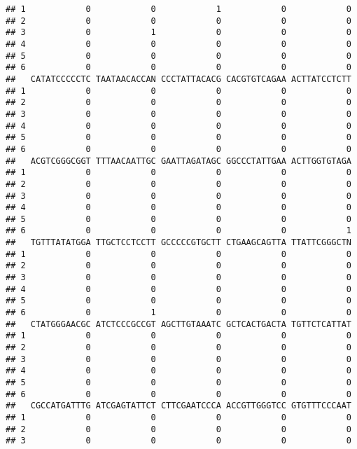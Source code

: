 \documentclass[]{article}
\begin{document}
\begin{verbatim}
## 1            0            0            1            0            0
## 2            0            0            0            0            0
## 3            0            1            0            0            0
## 4            0            0            0            0            0
## 5            0            0            0            0            0
## 6            0            0            0            0            0
##   CATATCCCCCTC TAATAACACCAN CCCTATTACACG CACGTGTCAGAA ACTTATCCTCTT
## 1            0            0            0            0            0
## 2            0            0            0            0            0
## 3            0            0            0            0            0
## 4            0            0            0            0            0
## 5            0            0            0            0            0
## 6            0            0            0            0            0
##   ACGTCGGGCGGT TTTAACAATTGC GAATTAGATAGC GGCCCTATTGAA ACTTGGTGTAGA
## 1            0            0            0            0            0
## 2            0            0            0            0            0
## 3            0            0            0            0            0
## 4            0            0            0            0            0
## 5            0            0            0            0            0
## 6            0            0            0            0            1
##   TGTTTATATGGA TTGCTCCTCCTT GCCCCCGTGCTT CTGAAGCAGTTA TTATTCGGGCTN
## 1            0            0            0            0            0
## 2            0            0            0            0            0
## 3            0            0            0            0            0
## 4            0            0            0            0            0
## 5            0            0            0            0            0
## 6            0            1            0            0            0
##   CTATGGGAACGC ATCTCCCGCCGT AGCTTGTAAATC GCTCACTGACTA TGTTCTCATTAT
## 1            0            0            0            0            0
## 2            0            0            0            0            0
## 3            0            0            0            0            0
## 4            0            0            0            0            0
## 5            0            0            0            0            0
## 6            0            0            0            0            0
##   CGCCATGATTTG ATCGAGTATTCT CTTCGAATCCCA ACCGTTGGGTCC GTGTTTCCCAAT
## 1            0            0            0            0            0
## 2            0            0            0            0            0
## 3            0            0            0            0            0

\end{verbatim}
\end{document}
